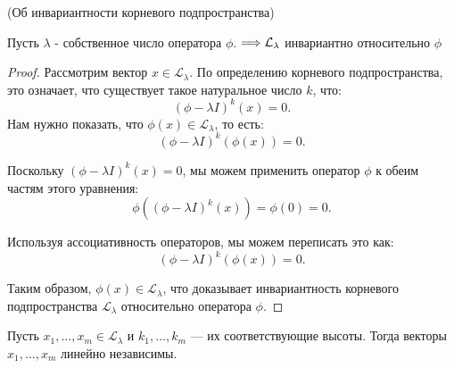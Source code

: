 \begin{shth}
    \begin{theorem} (Об инвариантности корневого подпространства)
        \leavevmode \nl 
            
            Пусть \(\lambda \) - собственное число оператора \(\phi \). \(\Longrightarrow \mathcal{L}_{\lambda}\) инвариантно относительно \(\phi\)
    \end{theorem}
\end{shth}



\begin{proof}
    Рассмотрим вектор \(x \in \mathcal{L}_{\lambda}\). По определению корневого подпространства, это означает, что существует такое натуральное число \(k\), что:
    \[
    (\phi - \lambda I)^k(x) = 0.
    \]
    Нам нужно показать, что \(\phi(x) \in \mathcal{L}_{\lambda}\), то есть:
    \[
    (\phi - \lambda I)^k(\phi(x)) = 0.
    \]

    Поскольку \((\phi - \lambda I)^k(x) = 0\), мы можем применить оператор \(\phi\) к обеим частям этого уравнения:
    \[
    \phi((\phi - \lambda I)^k(x)) = \phi(0) = 0.
    \]

    Используя ассоциативность операторов, мы можем переписать это как:
    \[
    (\phi - \lambda I)^k(\phi(x)) = 0.
    \]

    Таким образом, \(\phi(x) \in \mathcal{L}_{\lambda}\), что доказывает инвариантность корневого подпространства \(\mathcal{L}_{\lambda}\) относительно оператора \(\phi\).
\end{proof}



\begin{shth}
    \begin{theorem}
    \leavevmode \nl 
    
        Пусть $x_{1}, \ldots, x_{m} \in \mathcal{L}_{\lambda}$ и $k_{1}, \ldots, k_{m}$ — их соответствующие высоты. Тогда векторы $x_{1}, \ldots, x_{m}$ линейно независимы.
    \end{theorem}
\end{shth}

